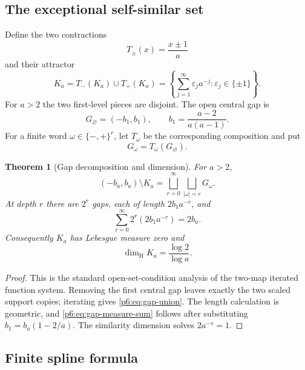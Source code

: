 \documentclass[11pt,oneside]{article}
\numberwithin{equation}{section}
\newtheorem{theorem}{Theorem}[section]
\theoremstyle{definition}
\theoremstyle{remark}
\begin{document}
\subsection{The exceptional self-similar set}

Define the two contractions
\begin{equation}\label{p6:eq:Tpm}
 T_\pm(x)=\frac{x\pm1}{a}
\end{equation}
and their attractor
\begin{equation}\label{p6:eq:Ka}
 K_a=T_-(K_a)\cup T_+(K_a)
 =\left\{
 \sum_{j=1}^{\infty}\varepsilon_ja^{-j}:
 \varepsilon_j\in\{\pm1\}
 \right\}.
\end{equation}
For $a>2$ the two first-level pieces are disjoint.  The open central gap is
\[
 G_\varnothing=(-b_1,b_1),
 \qquad b_1=\frac{a-2}{a(a-1)}.
\]
For a finite word $\omega\in\{-,+\}^r$, let $T_\omega$ be the corresponding
composition and put
\[
 G_\omega=T_\omega(G_\varnothing).
\]

\begin{theorem}[Gap decomposition and dimension]\label{p6:thm:gap-decomposition}
For $a>2$,
\begin{equation}\label{p6:eq:gap-union}
 (-b_a,b_a)\setminus K_a
 =\bigsqcup_{r=0}^{\infty}
 \bigsqcup_{|\omega|=r}G_\omega.
\end{equation}
At depth $r$ there are $2^r$ gaps, each of length $2b_1a^{-r}$, and
\begin{equation}\label{p6:eq:gap-measure-sum}
 \sum_{r=0}^{\infty}2^r(2b_1a^{-r})=2b_a.
\end{equation}
Consequently $K_a$ has Lebesgue measure zero and
\begin{equation}\label{p6:eq:Ka-dimension}
 \dim_{\mathrm H}K_a=\frac{\log2}{\log a}.
\end{equation}
\end{theorem}

\begin{proof}
This is the standard open-set-condition analysis of the two-map iterated
function system.  Removing the first central gap leaves exactly the two scaled
support copies; iterating gives \eqref{p6:eq:gap-union}.  The length calculation is
geometric, and \eqref{p6:eq:gap-measure-sum} follows after substituting
$b_1=b_a(1-2/a)$.  The similarity dimension solves
$2a^{-s}=1$.
\end{proof}

\subsection{Finite spline formula}
\end{document}
